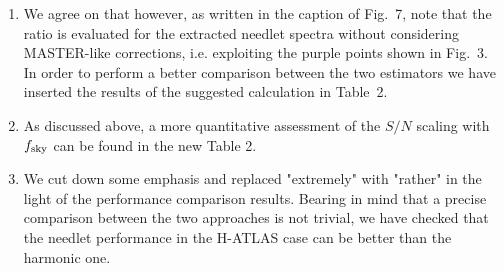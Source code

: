 \documentclass[a4paper,11pt]{article}
\begin{document}
\begin{enumerate}
\item{We agree on that however, as written in the caption of Fig.~7, note that the ratio is evaluated for the extracted needlet spectra without considering MASTER-like corrections, i.e. exploiting the purple points shown in Fig.~3. In order to perform a better comparison between the two estimators we have inserted the results of the suggested calculation in Table~2.}

\item{As discussed above, a more quantitative assessment of the $S/N$ scaling  with $f_{\rm sky}$ can be found in the new Table 2.}

\item{We cut down some emphasis and replaced "extremely" with "rather" in the light of the performance comparison results. Bearing in mind that a precise comparison between the two approaches is not trivial, we have checked that the needlet performance in the H-ATLAS case can be better than the harmonic one.}

\end{enumerate}
\end{document}
